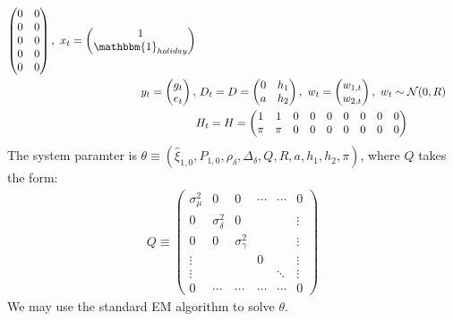 \documentclass[10pt]{article}
\numberwithin{equation}{section}
\begin{document}
\begin{align*}
\begin{pmatrix}
        0 & 0 \\
        0 & 0 \\
        0 & 0 \\
        0 & 0 \\
        0 & 0 
    \end{pmatrix},
    \ 
    x_t = \begin{pmatrix}
        1 \\
        \mathbbm{1}_{holiday}
    \end{pmatrix} \\
    y_t = \begin{pmatrix}
        g_t \\
        e_t 
    \end{pmatrix},
    &\ 
    D_t = D = \begin{pmatrix}
        0 & h_1 \\
        a & h_2
    \end{pmatrix},
    \ 
    w_t = \begin{pmatrix}
        w_{1,t} \\
        w_{2,t}
    \end{pmatrix} 
    , \ w_t\sim\mathcal{N}(0,R) \\
    & H_t = H = \begin{pmatrix}
        1 & 1 & 0 & 0 & 0 & 0 & 0 & 0 & 0 \\
        \pi & \pi & 0 & 0 & 0 & 0 & 0 & 0 & 0
    \end{pmatrix}
\end{align*}
The system paramter is $\theta\equiv(\hat{\xi}_{1,0}, P_{1,0}, \rho_{\delta}, \Delta_{\delta}, Q, R, a, h_1, h_2, \pi)$, where $Q$ takes the form:
\begin{align*}
    Q \equiv \begin{pmatrix}
        \sigma_{\mu}^2 & 0 & 0 & \cdots & \cdots & 0 \\
        0 & \sigma_{\delta}^2 & 0 & & & \vdots \\
        0 & 0 & \sigma_{\gamma}^2 & & & \vdots \\
        \vdots & & & 0 & & \vdots \\
        \vdots & & & & \ddots & \vdots \\
        0 & \cdots & \cdots & \cdots & \cdots & 0
    \end{pmatrix}
\end{align*}
We may use the standard EM algorithm to solve $\theta$.

\pagebreak
\printbibliography
\pagebreak
\appendix
\end{document}
